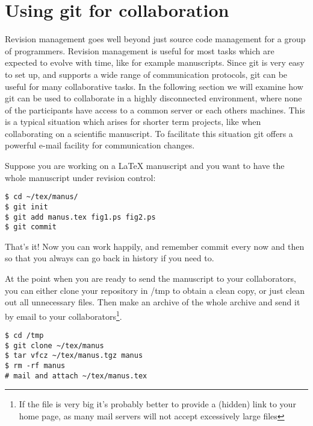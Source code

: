\documentclass[a4paper,10pt]{article}
\begin{document}

\section{Using git for collaboration}
Revision management goes well beyond just source code management for a group
of programmers. Revision management is useful for most tasks which are
expected to evolve with time, like for example manuscripts.
Since git is very easy to set up, and supports a wide range of communication
protocols, git can be useful for many collaborative tasks. In the following
section we will examine how git can be used to collaborate in a highly
disconnected environment, where none of the participants have access to a
common server or each others machines. This is a typical situation which
arises for shorter term projects, like when collaborating on a scientific
manuscript. To facilitate this situation git offers a powerful e-mail facility
for communication changes.

Suppose you are working on a LaTeX manuscript and you want to have the whole
manuscript under revision control:
\begin{verbatim}
$ cd ~/tex/manus/
$ git init
$ git add manus.tex fig1.ps fig2.ps
$ git commit
\end{verbatim}
That's it! Now you can work happily, and remember commit every now and then so
that you always can go back in history if you need to. 

At the point when you are ready to send the manuscript to your collaborators,
you can either clone your repository in /tmp to obtain a clean copy, or just
clean out all unnecessary files. Then make an archive of the whole archive and
send it by email to your collaborators\footnote{If the file is very big it's
probably better to provide a (hidden) link to your home page, as many mail
servers will not accept excessively large files}. 
\begin{verbatim}
$ cd /tmp
$ git clone ~/tex/manus
$ tar vfcz ~/tex/manus.tgz manus
$ rm -rf manus
# mail and attach ~/tex/manus.tex
\end{verbatim}
\end{document}
